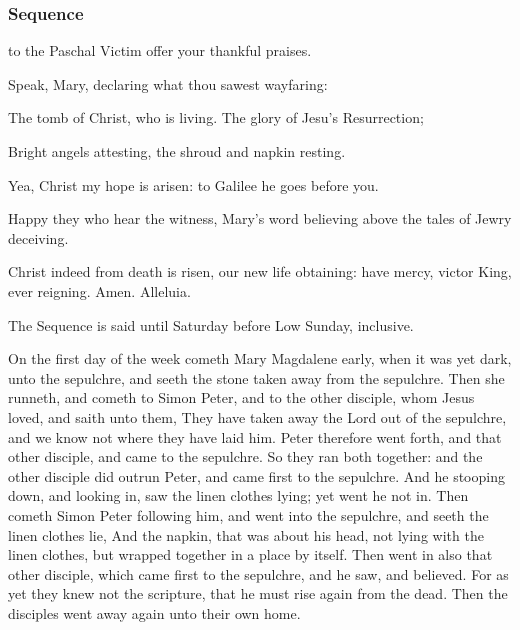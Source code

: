 
\subsubsection{Sequence}\label{PaschalSequence}
 to the Paschal Victim offer your thankful praises.\par
{}
Speak, Mary, declaring what thou sawest wayfaring:\par
The tomb of Christ, who is living. The glory of Jesu's Resurrection;\par
Bright angels attesting, the shroud and napkin resting.\par
Yea, Christ my hope is arisen: to Galilee he goes before you.\par
Happy they who hear the witness, Mary's word believing above the tales of Jewry deceiving.\par
Christ indeed from death is risen, our new life obtaining: have mercy, victor King, ever reigning. Amen. Alleluia.
\begin{rubric}
     The Sequence is said until Saturday before Low Sunday, inclusive.
\end{rubric}

 On the first day of the week cometh Mary Magdalene early, when it was yet dark, unto the sepulchre, and seeth the stone taken away from the sepulchre. Then she runneth, and cometh to Simon Peter, and to the other disciple, whom Jesus loved, and saith unto them, They have taken away the Lord out of the sepulchre, and we know not where they have laid him. Peter therefore went forth, and that other disciple, and came to the sepulchre. So they ran both together: and the other disciple did outrun Peter, and came first to the sepulchre. And he stooping down, and looking in, saw the linen clothes lying; yet went he not in. Then cometh Simon Peter following him, and went into the sepulchre, and seeth the linen clothes lie, And the napkin, that was about his head, not lying with the linen clothes, but wrapped together in a place by itself. Then went in also that other disciple, which came first to the sepulchre, and he saw, and believed. For as yet they knew not the scripture, that he must rise again from the dead. Then the disciples went away again unto their own home.


